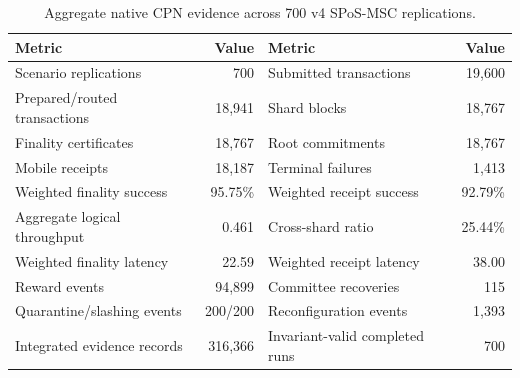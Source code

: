 \begin{table}[pos=t]
\centering
\caption{Aggregate native CPN evidence across 700 v4 SPoS-MSC replications.}
\label{tab:cpn_aggregate_native}
\footnotesize
\setlength{\tabcolsep}{5pt}
\renewcommand{\arraystretch}{1.08}
\begin{tabularx}{\textwidth}{Xr@{\hspace{1.0cm}}Xr}
\toprule
\textbf{Metric} & \textbf{Value} & \textbf{Metric} & \textbf{Value}\\
\midrule
Scenario replications & 700 & Submitted transactions & 19,600\\
Prepared/routed transactions & 18,941 & Shard blocks & 18,767\\
Finality certificates & 18,767 & Root commitments & 18,767\\
Mobile receipts & 18,187 & Terminal failures & 1,413\\
Weighted finality success & 95.75\% & Weighted receipt success & 92.79\%\\
Aggregate logical throughput & 0.461 & Cross-shard ratio & 25.44\%\\
Weighted finality latency & 22.59 & Weighted receipt latency & 38.00\\
Reward events & 94,899 & Committee recoveries & 115\\
Quarantine/slashing events & 200/200 & Reconfiguration events & 1,393\\
Integrated evidence records & 316,366 & Invariant-valid completed runs & 700\\
\bottomrule
\end{tabularx}
\end{table}